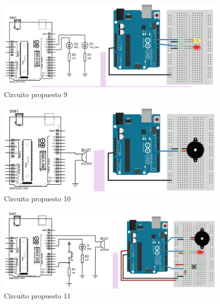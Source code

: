 \begin{figure}[H]
  \centering
  \includegraphics[scale = 0.5]{Imagenes/circPropuestos/cp_9.png}
  \caption{Circuito propuesto 9}
\end{figure}

\begin{figure}[H]
  \centering
  \includegraphics[scale = 0.5]{Imagenes/circPropuestos/cp_10.png}
  \caption{Circuito propuesto 10}
\end{figure}

\begin{figure}[H]
  \centering
  \includegraphics[scale = 0.5]{Imagenes/circPropuestos/cp_11.png}
  \caption{Circuito propuesto 11}
\end{figure}